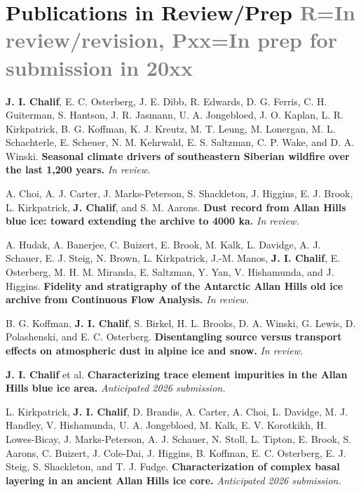 \documentclass[a4paper,11pt]{article}
\begin{document}
\section{\textbf{Publications in Review/Prep} \hfill \textcolor{gray}{\scriptsize R=In review/revision, Pxx=In prep for submission in 20xx}}
\begin{enumerate}[leftmargin=*, labelsep=0.5em, align=left, widest={[\textbf{S.1}]}, itemindent=0em, label={\textbf{[\arabic*]}]}]

\item[\textbf{R}] \textbf{J. I. Chalif}, E. C. Osterberg, J. E. Dibb, R. Edwards, D. G. Ferris, C. H. Guiterman, S. Hantson, J. R. Jasmann, U. A. Jongebloed, J. O. Kaplan, L. R. Kirkpatrick, B. G. Koffman, K. J. Kreutz, M. T. Leung, M. Lonergan, M. L. Schachterle, E. Scheuer, N. M. Kehrwald, E. S. Saltzman, C. P. Wake, and D. A. Winski. \textbf{Seasonal climate drivers of southeastern Siberian wildfire over the last 1,200 years.} \textit{In review.}

\item[\textbf{R}] A. Choi, A. J. Carter, J. Marks-Peterson, S. Shackleton, J. Higgins, E. J. Brook, L. Kirkpatrick, \textbf{J. Chalif}, and S. M. Aarons. \textbf{Dust record from Allan Hills blue ice: toward extending the archive to 4000 ka.} \textit{In review.}

\item[\textbf{R}] A. Hudak, A. Banerjee, C. Buizert, E. Brook, M. Kalk, L. Davidge, A. J. Schauer, E. J. Steig, N. Brown, L. Kirkpatrick, J.-M. Manos, \textbf{J. I. Chalif}, E. Osterberg, M. H. M. Miranda, E. Saltzman, Y. Yan, V. Hishamunda, and J. Higgins. \textbf{Fidelity and stratigraphy of the Antarctic Allan Hills old ice archive from Continuous Flow Analysis.} \textit{In review.}

\item[\textbf{R}] B. G. Koffman, \textbf{J. I. Chalif}, S. Birkel, H. L. Brooks, D. A. Winski, G. Lewis, D. Polashenski, and E. C. Osterberg. \textbf{Disentangling source versus transport effects on atmospheric dust in alpine ice and snow.} \textit{In review.}

\item[\textbf{P26}] \textbf{J. I. Chalif} et al. \textbf{Characterizing trace element impurities in the Allan Hills blue ice area.} \textit{Anticipated 2026 submission.}

\item[\textbf{P26}] L. Kirkpatrick, \textbf{J. I. Chalif}, D. Brandis, A. Carter, A. Choi, L. Davidge, M. J. Handley, V. Hishamunda, U. A. Jongebloed, M. Kalk, E. V. Korotkikh, H. Lowes-Bicay, J. Marks-Peterson, A. J. Schauer, N. Stoll, L. Tipton, E. Brook, S. Aarons, C. Buizert, J. Cole-Dai, J. Higgins, B. Koffman, E. C. Osterberg, E. J. Steig, S. Shackleton, and T. J. Fudge. \textbf{Characterization of complex basal layering in an ancient Allan Hills ice core.} \textit{Anticipated 2026 submission.}


\end{enumerate}
\end{document}
